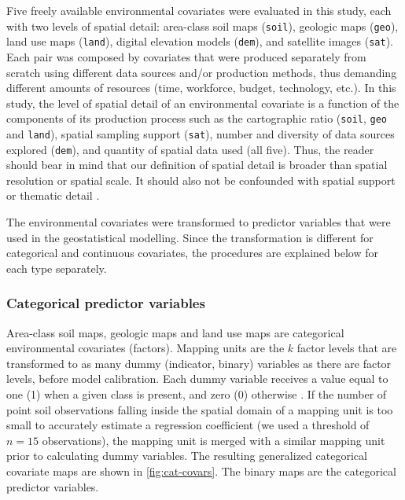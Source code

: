 Five freely available environmental covariates were evaluated in this study, each with two levels of spatial 
detail: area-class soil maps (\texttt{soil}), geologic maps (\texttt{geo}), land use maps (\texttt{land}), 
digital elevation models (\texttt{dem}), and satellite images (\texttt{sat}). Each pair was composed by 
covariates that were produced separately from scratch using different data sources and/or production methods, 
thus demanding different amounts of resources (time, workforce, budget, technology, etc.). In this study,
the level of spatial detail of an environmental covariate is a function of the components of its production 
process such as the cartographic ratio (\texttt{soil}, \texttt{geo} and \texttt{land}), spatial sampling 
support (\texttt{sat}), number and diversity of data sources explored (\texttt{dem}), and quantity of spatial 
data used (all five). Thus, the reader should bear in mind that our definition of spatial detail is broader 
than spatial resolution or spatial scale. It should also not be confounded with spatial support 
\cite{WebsterEtAl2007} or thematic detail \cite{Rossiter2000}.

The environmental covariates were transformed to predictor variables that were used in the geostatistical 
modelling. Since the transformation is different for categorical and continuous covariates, the procedures are 
explained below for each type separately.

\subsubsection*{Categorical predictor variables}
\label{subsubsec:categorical-covars}

Area-class soil maps, geologic maps and land use maps are categorical environmental covariates (factors). 
Mapping units are the $k$ factor levels that are transformed to as many dummy (indicator, binary) variables as 
there are factor levels, before model calibration. Each dummy variable receives a value equal to one (1) when a 
given class is present, and zero (0) otherwise \cite{Everitt2006}. If the number of point soil observations 
falling inside the spatial domain of a mapping unit is too small to accurately estimate a regression 
coefficient (we used a threshold of $n=15$ observations), the mapping unit is merged with a similar mapping 
unit prior to calculating dummy variables. The resulting generalized categorical covariate maps are shown in 
\autoref{fig:cat-covars}. The binary maps are the categorical predictor variables.

